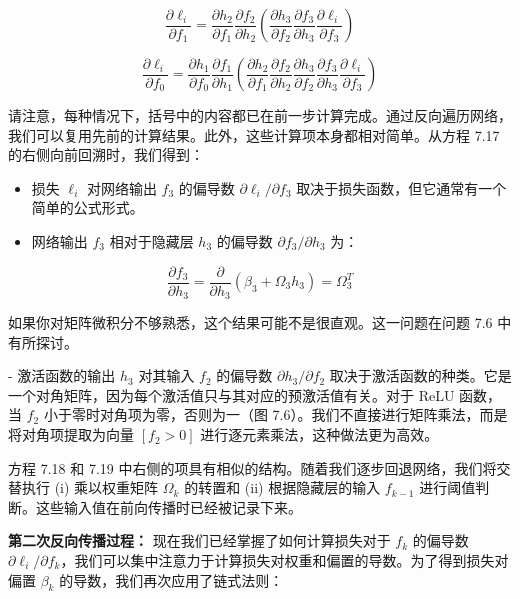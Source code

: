 \documentclass[lang=cn,newtx,10pt,scheme=chinese]{elegantbook}
\begin{document}
\begin{equation}
\frac{\partial \ell_i}{\partial f_1} = \frac{\partial h_2}{\partial f_1}  \frac{\partial f_2}{\partial h_2}\left( \frac{\partial h_3}{\partial f_2} \frac{\partial f_3}{\partial h_3} \frac{\partial \ell_i}{\partial f_3} \right) 
\end{equation}


\begin{equation}
\frac{\partial \ell_i}{\partial f_0} = \frac{\partial h_1}{\partial f_0} \frac{\partial f_1}{\partial h_1} \left( \frac{\partial h_2}{\partial f_1} \frac{\partial f_2}{\partial h_2} \frac{\partial h_3}{\partial f_2} \frac{\partial f_3}{\partial h_3} \frac{\partial \ell_i}{\partial f_3} \right) 
\end{equation}

请注意，每种情况下，括号中的内容都已在前一步计算完成。通过反向遍历网络，我们可以复用先前的计算结果。此外，这些计算项本身都相对简单。从方程 7.17 的右侧向前回溯时，我们得到：
\begin{itemize}
    \item 损失 \(\ell_i\) 对网络输出 \(f_3\) 的偏导数 \(\partial \ell_i/\partial f_3\) 取决于损失函数，但它通常有一个简单的公式形式。
    \item 网络输出 \(f_3\) 相对于隐藏层 \(h_3\) 的偏导数 \(\partial f_3/\partial h_3\) 为：
\end{itemize}


\begin{equation}
\frac{\partial f_3}{\partial h_3} = \frac{\partial}{\partial h_3} (\beta_3 + \Omega_3 h_3) = \Omega_3^T  
\end{equation}

如果你对矩阵微积分不够熟悉，这个结果可能不是很直观。这一问题在问题 7.6 中有所探讨。

- 激活函数的输出 \(h_3\) 对其输入 \(f_2\) 的偏导数 \(\partial h_3/\partial f_2\) 取决于激活函数的种类。它是一个对角矩阵，因为每个激活值只与其对应的预激活值有关。对于 ReLU 函数，当 \(f_2\) 小于零时对角项为零，否则为一（图 7.6）。我们不直接进行矩阵乘法，而是将对角项提取为向量 \([f_2 > 0]\) 进行逐元素乘法，这种做法更为高效。

方程 7.18 和 7.19 中右侧的项具有相似的结构。随着我们逐步回退网络，我们将交替执行 (i) 乘以权重矩阵 \(\Omega_k\) 的转置和 (ii) 根据隐藏层的输入 \(f_{k-1}\) 进行阈值判断。这些输入值在前向传播时已经被记录下来。


\textbf{第二次反向传播过程：} 现在我们已经掌握了如何计算损失对于 \(f_k\) 的偏导数 \(\partial \ell_i/\partial f_k\)，我们可以集中注意力于计算损失对权重和偏置的导数。为了得到损失对偏置 \(\beta_k\) 的导数，我们再次应用了链式法则：
\end{document}

